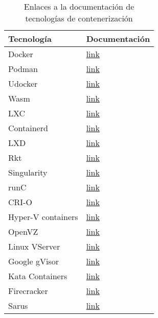 \begin{table}[H]
\centering
\scriptsize
\setlength{\tabcolsep}{3pt}
\renewcommand{\arraystretch}{1.1}
\begin{tabular}{|>{\raggedright\arraybackslash}p{4cm}|>{\centering\arraybackslash}p{2.5cm}|}
\hline
\centering\textbf{Tecnología} & \textbf{Documentación} \\
\hline
Docker & \href{https://docs.docker.com/}{link} \\
\hline
Podman & \href{https://podman.io/docs}{link} \\
\hline
Udocker & \href{https://github.com/indigo-dc/udocker}{link} \\
\hline
Wasm & \href{https://webassembly.org/docs/faq/}{link} \\
\hline
LXC & \href{https://linuxcontainers.org/incus/docs/main/}{link} \\
\hline
Containerd & \href{https://containerd.io/docs/}{link} \\
\hline
LXD & \href{https://linuxcontainers.org/incus/docs/main/}{link} \\
\hline
Rkt & \href{https://github.com/rkt/rkt}{link} \\
\hline
Singularity & \href{https://docs.sylabs.io/guides/4.3/user-guide/}{link} \\
\hline
runC & \href{https://github.com/opencontainers/runc}{link} \\
\hline
CRI-O & \href{https://github.com/cri-o/cri-o}{link} \\
\hline
Hyper-V containers & \href{https://docs.microsoft.com/en-us/virtualization/windowscontainers/}{link} \\
\hline
OpenVZ & \href{https://openvz.org/}{link} \\
\hline
Linux VServer & \href{http://linux-vserver.org/Documentation}{link} \\
\hline
Google gVisor & \href{https://gvisor.dev/docs/}{link} \\
\hline
Kata Containers & \href{https://katacontainers.io/docs/}{link} \\
\hline
Firecracker & \href{https://firecracker-microvm.github.io/}{link} \\
\hline
Sarus & \href{https://github.com/eth-cscs/sarus}{link} \\
\hline
\end{tabular}
\caption{Enlaces a la documentación de tecnologías de contenerización}\label{tab:documentacion-tecnologias}
\end{table}